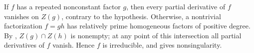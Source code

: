 If $f$ has a repeated nonconstant factor $g$, then every partial derivative of $f$ vanishes on $Z(g)$, contrary to the hypothesis. Otherwise, a nontrivial factorization $f=gh$ has relatively prime homogeneous factors of positive degree. By , $Z(g)\cap Z(h)$ is nonempty; at any point of this intersection all partial derivatives of $f$ vanish. Hence $f$ is irreducible, and  gives nonsingularity.
